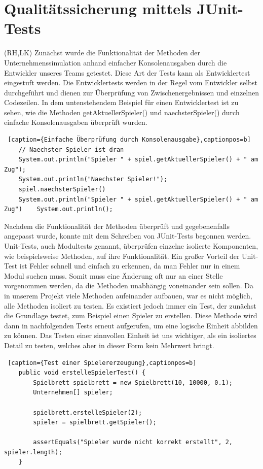 \clearpage
\chapter{Qualitätssicherung mittels JUnit-Tests}
(RH,LK) Zunächst wurde die Funktionalität der Methoden der Unternehmenssimulation anhand einfacher Konsolenausgaben durch die Entwickler unseres Teams getestet. Diese Art der Tests kann als Entwicklertest eingestuft werden. Die Entwicklertests werden in der Regel vom Entwickler selbst durchgeführt und dienen zur Überprüfung von Zwischenergebnissen und einzelnen Codezeilen. In dem untenstehendem Beispiel für einen Entwicklertest ist zu sehen, wie die Methoden getAktuellerSpieler() und naechsterSpieler() durch einfache Konsolenausgaben überprüft wurden.

\lstset{language=Java}
\begin{lstlisting} [caption={Einfache Überprüfung durch Konsolenausgabe},captionpos=b]
	// Naechster Spieler ist dran 
	System.out.println("Spieler " + spiel.getAktuellerSpieler() + " am Zug");
	System.out.println("Naechster Spieler!");
	spiel.naechsterSpieler()	
	System.out.println("Spieler " + spiel.getAktuellerSpieler() + " am Zug")	System.out.println();
\end{lstlisting}

Nachdem die Funktionalität der Methoden überprüft und gegebenenfalls angepasst wurde, konnte mit dem Schreiben von JUnit-Tests begonnen werden. Unit-Tests, auch Modultests genannt, überprüfen einzelne isolierte Komponenten, wie beispielsweise Methoden, auf ihre Funktionalität. Ein großer Vorteil der Unit-Test ist Fehler schnell und einfach zu erkennen, da man Fehler nur in einem Modul suchen muss. Somit muss eine Änderung oft nur an einer Stelle vorgenommen werden, da die Methoden unabhängig voneinander sein sollen. Da in unserem Projekt viele Methoden aufeinander aufbauen, war es nicht möglich, alle Methoden isoliert zu testen. Es existiert jedoch immer ein Test, der zunächst die Grundlage testet, zum Beispiel einen Spieler zu erstellen. Diese Methode wird dann in nachfolgenden Tests erneut aufgerufen, um eine logische Einheit abbilden zu können. Das Testen einer sinnvollen Einheit ist uns wichtiger, als ein isoliertes Detail zu testen, welches aber in dieser Form kein Mehrwert bringt.

\lstset{language=Java}
\begin{lstlisting} [caption={Test einer Spielererzeugung},captionpos=b]
	public void erstelleSpielerTest() {
		Spielbrett spielbrett = new Spielbrett(10, 10000, 0.1);
		Unternehmen[] spieler;
		
		spielbrett.erstelleSpieler(2);
		spieler = spielbrett.getSpieler();
		
		assertEquals("Spieler wurde nicht korrekt erstellt", 2, spieler.length);
	}
\end{lstlisting}


